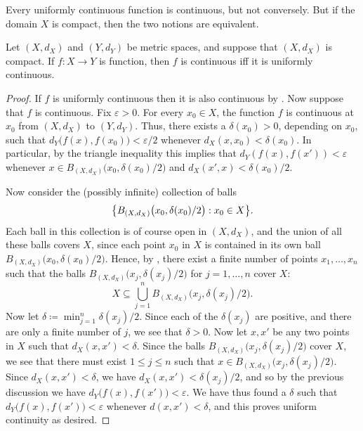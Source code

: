 \begin{note}
  Every uniformly continuous function is continuous, but not conversely.
  But if the domain \(X\) is compact, then the two notions are equivalent.
\end{note}

\begin{thm}\label{ii:2.3.5}
  Let \((X, d_X)\) and \((Y, d_Y)\) be metric spaces, and suppose that \((X, d_X)\) is compact.
  If \(f : X \to Y\) is function, then \(f\) is continuous iff it is uniformly continuous.
\end{thm}

\begin{proof}
  If \(f\) is uniformly continuous then it is also continuous by .
  Now suppose that \(f\) is continuous.
  Fix \(\varepsilon > 0\).
  For every \(x_0 \in X\), the function \(f\) is continuous at \(x_0\) from \((X, d_X)\) to \((Y, d_Y)\).
  Thus, there exists a \(\delta(x_0) > 0\), depending on \(x_0\), such that \(d_Y\big(f(x), f(x_0)\big) < \varepsilon / 2\) whenever \(d_X(x, x_0) < \delta(x_0)\).
  In particular, by the triangle inequality this implies that \(d_Y(f(x), f(x')) < \varepsilon\) whenever \(x \in B_{(X, d_X)}\big(x_0, \delta(x_0) / 2\big)\) and \(d_X(x', x) < \delta(x_0) / 2\).

  Now consider the (possibly infinite) collection of balls
  \[
    \set{B_{(X, d_X)}\big(x_0, \delta(x_0) / 2\big) : x_0 \in X}.
  \]
  Each ball in this collection is of course open in \((X, d_X)\), and the union of all these balls covers \(X\), since each point \(x_0\) in \(X\) is contained in its own ball \(B_{(X, d_X)}\big(x_0, \delta(x_0) / 2\big)\).
  Hence, by , there exist a finite number of points \(x_1, \dots, x_n\) such that the balls \(B_{(X, d_X)}\big(x_j, \delta(x_j) / 2\big)\) for \(j = 1, \dots, n\) cover \(X\):
  \[
    X \subseteq \bigcup_{j = 1}^n B_{(X, d_X)}\big(x_j, \delta(x_j) / 2\big).
  \]
  Now let \(\delta \coloneqq \min_{j = 1}^n \delta(x_j) / 2\).
  Since each of the \(\delta(x_j)\) are positive, and there are only a finite number of \(j\), we see that \(\delta > 0\).
  Now let \(x, x'\) be any two points in \(X\) such that \(d_X(x, x') < \delta\).
  Since the balls \(B_{(X, d_X)}\big(x_j, \delta(x_j) / 2\big)\) cover \(X\), we see that there must exist \(1 \leq j \leq n\) such that \(x \in B_{(X, d_X)}\big(x_j, \delta(x_j) / 2\big)\).
  Since \(d_X(x, x') < \delta\), we have \(d_X(x, x') < \delta(x_j) / 2\), and so by the previous discussion we have \(d_Y\big(f(x), f(x')\big) < \varepsilon\).
  We have thus found a \(\delta\) such that \(d_Y\big(f(x), f(x')\big) < \varepsilon\) whenever \(d(x, x') < \delta\), and this proves uniform continuity as desired.
\end{proof}

